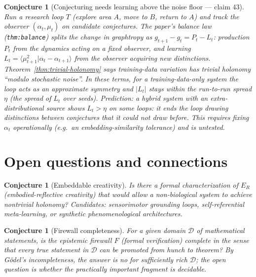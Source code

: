 \documentclass[11pt,a4paper]{article}
\newtheorem{conjecture}[definition]{Conjecture}
\begin{document}
\begin{conjecture}[Conjecturing needs learning above the noise floor --- claim 43]
\label{conj:v2-noise}
Run a research loop $T$ (explore area $A$, move to $B$, return to $A$) and
track the observer $(\alpha_t,\mu_t)$ on candidate conjectures. The paper's
balance law (\texttt{thm:balance}) splits the change in graphtropy as
$g_{t+1}-g_t=P_t-L_t$: production $P_t$ from the dynamics acting on a fixed
observer, and learning $L_t=\langle\mu_{t+1}^2|\alpha_t-\alpha_{t+1}\rangle$
from the observer acquiring new distinctions. Theorem~\ref{thm:trivial-holonomy}
says training-data variation has trivial holonomy ``modulo stochastic noise''.
In these terms, for a training-data-only system the loop acts as an approximate
symmetry and $|L_t|$ stays within the run-to-run spread $\eta$ (the spread of
$L_t$ over seeds). Prediction: a hybrid system with an extra-distributional
source shows $L_t>\eta$ on some loops: it ends the loop drawing distinctions
between conjectures that it could not draw before. This requires fixing
$\alpha_t$ operationally (e.g.\ an embedding-similarity tolerance) and is
untested.
\end{conjecture}

\section{Open questions and connections}

\begin{conjecture}[Embeddable creativity]
Is there a formal characterization of $E_R$ (embodied-reflective
creativity) that would allow a non-biological system to achieve
nontrivial holonomy? Candidates: sensorimotor grounding loops,
self-referential meta-learning, or synthetic phenomenological
architectures.
\end{conjecture}

\begin{conjecture}[Firewall completeness]
For a given domain $\mathcal{D}$ of mathematical statements, is the
epistemic firewall $F$ (formal verification) complete in the sense that
every true statement in $\mathcal{D}$ can be promoted from hunch to
theorem? By G\"odel's incompleteness, the answer is no for sufficiently
rich $\mathcal{D}$; the open question is whether the practically
important fragment is decidable.
\end{conjecture}
\end{document}
